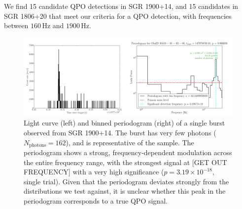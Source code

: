 \documentclass[numberedappendix]{emulateapj}
\newcommand{\hz}{\,\mathrm{Hz}}
\begin{document}
We find 15 candidate QPO detections in SGR 1900+14, and 15 candidates in SGR 1806+20 that meet our criteria for a QPO detection, with frequencies between $160\hz$ and $1900\hz$. 



\begin{figure}[htbp]
\begin{center}
\includegraphics[width=18cm]{sgr1900_burst_example.png}
\caption{Light curve (left) and binned periodogram (right) of a single burst observed from SGR 1900+14. The burst has very few photons ($N_{\mathrm{photons}} = 162$), and is representative of the sample. The periodogram shows a strong, frequency-dependent modulation across the entire frequency range, with the strongest signal at [GET OUT FREQUENCY] with a very high significance ($p = 3.19 \times 10^{-18}$, single trial). Given that the periodogram deviates strongly from the distributions we test against, it is unclear whether this peak in the periodogram corresponds to a true QPO signal.}
\label{fig:psd_individual_example}
\end{center}
\end{figure}
\end{document}
